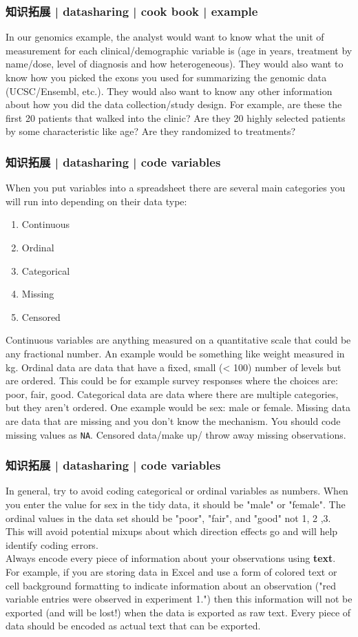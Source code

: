 \begin{frame}
  \frametitle{知识拓展 | datasharing | cook book | example}
  In our genomics example, the analyst would want to know what the unit of measurement for each clinical/demographic variable is (age in years, treatment by name/dose, level of diagnosis and how heterogeneous). They would also want to know how you picked the exons you used for summarizing the genomic data (UCSC/Ensembl, etc.). They would also want to know any other information about how you did the data collection/study design. For example, are these the first 20 patients that walked into the clinic? Are they 20 highly selected patients by some characteristic like age? Are they randomized to treatments? 
\end{frame}

\begin{frame}[fragile]
  \frametitle{知识拓展 | datasharing | code variables}
  When you put variables into a spreadsheet there are several main categories you will run into depending on their data type:
  \begin{enumerate}
    \item Continuous
    \item Ordinal
    \item Categorical
    \item Missing
    \item Censored
  \end{enumerate}

  Continuous variables are anything measured on a quantitative scale that could be any fractional number. An example would be something like weight measured in kg. Ordinal data are data that have a fixed, small (< 100) number of levels but are ordered. This could be for example survey responses where the choices are: poor, fair, good.  Categorical data are data where there are multiple categories, but they aren't ordered. One example would be sex: male or female. Missing data are data that are missing and you don't know the mechanism. You should code missing values as \verb|NA|.  Censored data/make up/ throw away missing observations.
\end{frame}

\begin{frame}
  \frametitle{知识拓展 | datasharing | code variables}
  In general, try to avoid coding categorical or ordinal variables as numbers. When you enter the value for sex in the tidy data, it should be "male" or "female". The ordinal values in the data set should be "poor", "fair", and "good" not 1, 2 ,3. This will avoid potential mixups about which direction effects go and will help identify coding errors.\\
  \vspace{1em}
  Always encode every piece of information about your observations using \textbf{text}. For example, if you are storing data in Excel and use a form of colored text or cell background formatting to indicate information about an observation ("red variable entries were observed in experiment 1.") then this information will not be exported (and will be lost!) when the data is exported as raw text. Every piece of data should be encoded as actual text that can be exported. 
\end{frame}

